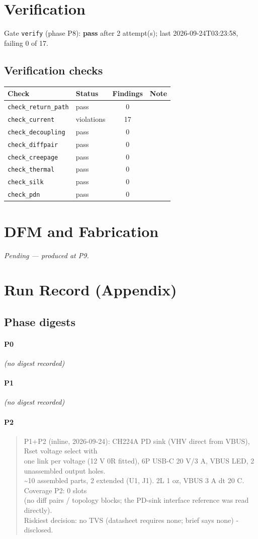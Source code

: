 \documentclass[11pt,a4paper]{article}
\begin{document}
\section{Verification}
Gate \texttt{verify} (phase P8): \textbf{pass} after 2 attempt(s); last 2026-09-24T03:23:58, failing 0 of 17.
\subsection*{Verification checks}
{\small
\begin{longtable}{llcp{6cm}}
\toprule
\textbf{Check} & \textbf{Status} & \textbf{Findings} & \textbf{Note} \\
\midrule
\endhead
\texttt{check\_return\_path} & pass & 0 &  \\
\texttt{check\_current} & violations & 17 &  \\
\texttt{check\_decoupling} & pass & 0 &  \\
\texttt{check\_diffpair} & pass & 0 &  \\
\texttt{check\_creepage} & pass & 0 &  \\
\texttt{check\_thermal} & pass & 0 &  \\
\texttt{check\_silk} & pass & 0 &  \\
\texttt{check\_pdn} & pass & 0 &  \\
\bottomrule
\end{longtable}
}
\section{DFM and Fabrication}
\emph{Pending --- produced at P9.}
\section{Run Record (Appendix)}
\subsection*{Phase digests}
\paragraph*{P0}
\emph{(no digest recorded)}
\paragraph*{P1}
\emph{(no digest recorded)}
\paragraph*{P2}
\begin{quote}\small\ttfamily\raggedright
P1+P2 (inline, 2026-09-24): CH224A PD sink (VHV direct from VBUS), Rset voltage select with\\
one link per voltage (12 V 0R fitted), 6P USB-C 20 V/3 A, VBUS LED, 2 unassembled output holes.\\
\textasciitilde{}10 assembled parts, 2 extended (U1, J1). 2L 1 oz, VBUS 3 A dt 20 C. Coverage P2: 0 slots\\
(no diff pairs / topology blocks; the PD-sink interface reference was read directly).\\
Riskiest decision: no TVS (datasheet requires none; brief says none) - disclosed.
\end{quote}
\end{document}
